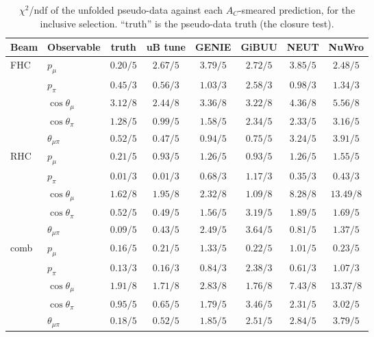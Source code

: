 \documentclass[11pt,a4paper]{article}
\begin{document}
\begin{table}[H]
  \centering
  \caption{$\chi^2$/ndf of the unfolded pseudo-data against each $A_C$-smeared prediction,
    for the inclusive selection. ``truth'' is the pseudo-data truth (the closure test).}
  \label{tab:chi2_incl}
  \small
  \begin{tabular}{llcccccc}
\toprule
Beam & Observable & truth & uB tune & GENIE & GiBUU & NEUT & NuWro \\
\midrule
    FHC  & $p_\mu$                & $0.20/5$ & $2.67/5$ & $3.79/5$ & $2.72/5$ & $3.85/5$ & $2.48/5$ \\
         & $p_\pi$                & $0.45/3$ & $0.56/3$ & $1.03/3$ & $2.58/3$ & $0.98/3$ & $1.34/3$ \\
         & $\cos\theta_\mu$       & $3.12/8$ & $2.44/8$ & $3.36/8$ & $3.22/8$ & $4.36/8$ & $5.56/8$ \\
         & $\cos\theta_\pi$       & $1.28/5$ & $0.99/5$ & $1.58/5$ & $2.34/5$ & $2.33/5$ & $3.16/5$ \\
         & $\theta_{\mu\pi}$      & $0.52/5$ & $0.47/5$ & $0.94/5$ & $0.75/5$ & $3.24/5$ & $3.91/5$ \\
    \midrule
    RHC  & $p_\mu$                & $0.21/5$ & $0.93/5$ & $1.26/5$ & $0.93/5$ & $1.26/5$ & $1.55/5$ \\
         & $p_\pi$                & $0.01/3$ & $0.01/3$ & $0.68/3$ & $1.17/3$ & $0.35/3$ & $0.43/3$ \\
         & $\cos\theta_\mu$       & $1.62/8$ & $1.95/8$ & $2.32/8$ & $1.09/8$ & $8.28/8$ & $13.49/8$ \\
         & $\cos\theta_\pi$       & $0.52/5$ & $0.49/5$ & $1.56/5$ & $3.19/5$ & $1.89/5$ & $1.69/5$ \\
         & $\theta_{\mu\pi}$      & $0.09/5$ & $0.43/5$ & $2.49/5$ & $3.64/5$ & $0.81/5$ & $1.37/5$ \\
    \midrule
    comb & $p_\mu$                & $0.16/5$ & $0.21/5$ & $1.33/5$ & $0.22/5$ & $1.01/5$ & $0.23/5$ \\
         & $p_\pi$                & $0.13/3$ & $0.16/3$ & $0.84/3$ & $2.38/3$ & $0.61/3$ & $1.07/3$ \\
         & $\cos\theta_\mu$       & $1.91/8$ & $1.71/8$ & $2.83/8$ & $1.76/8$ & $7.43/8$ & $13.37/8$ \\
         & $\cos\theta_\pi$       & $0.95/5$ & $0.65/5$ & $1.79/5$ & $3.46/5$ & $2.31/5$ & $3.02/5$ \\
         & $\theta_{\mu\pi}$      & $0.18/5$ & $0.52/5$ & $1.85/5$ & $2.51/5$ & $2.84/5$ & $3.79/5$ \\
\bottomrule
\end{tabular}
\end{table}
\end{document}
